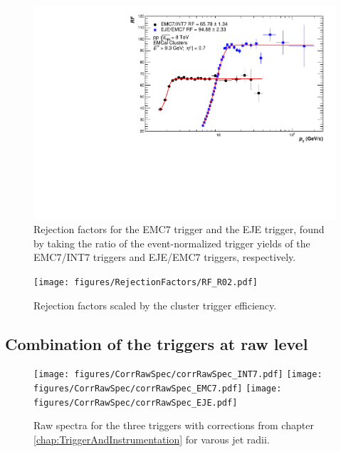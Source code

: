 \documentclass[ALICE]{ALICE_analysis_notes}
\begin{document}
\begin{figure}
    \centering
    \includegraphics[width=15cm]{figures/RejectionFactors/RF_R02_Unscaled.pdf}
    \caption{Rejection factors for the EMC7 trigger and the EJE trigger, found by taking the ratio of the event-normalized trigger yields of the EMC7/INT7 triggers and EJE/EMC7 triggers, respectively.}
    \label{fig:RejectionFactorsUnscaled}
\end{figure}

\begin{figure}
    \centering
    \texttt{[image: figures/RejectionFactors/RF\_R02.pdf]}
    \caption{Rejection factors scaled by the cluster trigger efficiency.}
    \label{fig:RejectionFactors}
\end{figure}

\subsection{Combination of the triggers at raw level}
\label{sec:triggerCombination}

\begin{figure}
    \centering
    \begin{multicols}{2}
            \texttt{[image: figures/CorrRawSpec/corrRawSpec\_INT7.pdf]}
            \texttt{[image: figures/CorrRawSpec/corrRawSpec\_EMC7.pdf]}
        \vfill\null 
        \columnbreak
            \texttt{[image: figures/CorrRawSpec/corrRawSpec\_EJE.pdf]}
        \vfill\null
    \end{multicols}
    \caption{Raw spectra for the three triggers with corrections from chapter \ref{chap:TriggerAndInstrumentation} for varous jet radii.}
    \label{fig:CorrRawSpec}
\end{figure}
\end{document}
